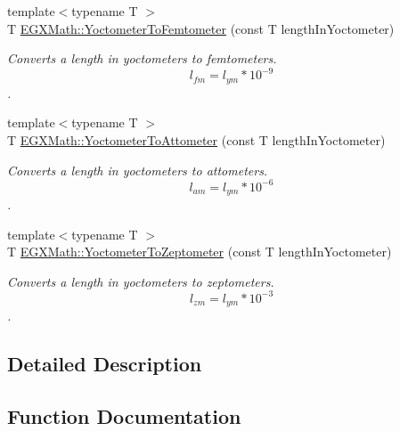 \begin{DoxyCompactItemize}
{\footnotesize template$<$typename T $>$ }\\T \mbox{\hyperlink{group___e_g_x_math-_conversions-_length_conversions-_s_i-_yoctometer-_s_i_ga2e4981232314be21ccfbe019886c5048}{E\+G\+X\+Math\+::\+Yoctometer\+To\+Femtometer}} (const T length\+In\+Yoctometer)
\begin{DoxyCompactList}\small\item\em Converts a length in yoctometers to femtometers. \[ l_{fm}=l_{ym} * 10^{-9} \]. \end{DoxyCompactList}\item 
{\footnotesize template$<$typename T $>$ }\\T \mbox{\hyperlink{group___e_g_x_math-_conversions-_length_conversions-_s_i-_yoctometer-_s_i_ga1c259ce5be00a40690fecbc2e71083fd}{E\+G\+X\+Math\+::\+Yoctometer\+To\+Attometer}} (const T length\+In\+Yoctometer)
\begin{DoxyCompactList}\small\item\em Converts a length in yoctometers to attometers. \[ l_{am}=l_{ym} * 10^{-6} \]. \end{DoxyCompactList}\item 
{\footnotesize template$<$typename T $>$ }\\T \mbox{\hyperlink{group___e_g_x_math-_conversions-_length_conversions-_s_i-_yoctometer-_s_i_gab7c5e5b6659fb99614f1e47b8033ea85}{E\+G\+X\+Math\+::\+Yoctometer\+To\+Zeptometer}} (const T length\+In\+Yoctometer)
\begin{DoxyCompactList}\small\item\em Converts a length in yoctometers to zeptometers. \[ l_{zm}=l_{ym} * 10^{-3} \]. \end{DoxyCompactList}\end{DoxyCompactItemize}


\subsection{Detailed Description}


\subsection{Function Documentation}
\mbox{\label{group___e_g_x_math-_conversions-_length_conversions-_s_i-_yoctometer-_s_i_ga1c259ce5be00a40690fecbc2e71083fd}} 
